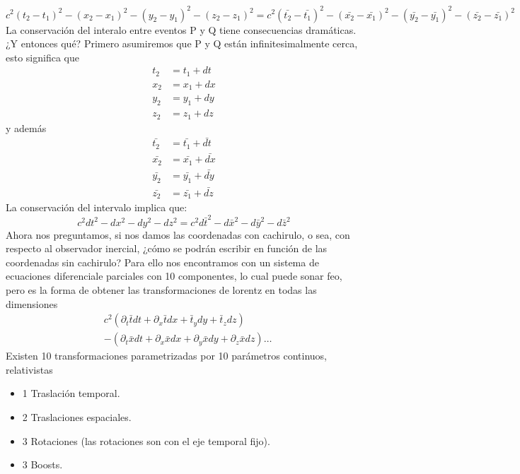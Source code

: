 \documentclass[../main.tex]{subfiles}
\begin{document}
\begin{equation}
    c^2(t_2-t_1)^2-(x_2-x_1)^2-(y_2-y_1)^2-(z_2-z_1)^2=c^2(\bar{t_2}-\bar{t_1})^2-(\bar{x_2}-\bar{x_1})^2-(\bar{y_2}-\bar{y_1})^2-(\bar{z_2}-\bar{z_1})^2
\end{equation}
La conservación del interalo entre eventos P y Q tiene consecuencias dramáticas. ¿Y entonces qué? Primero asumiremos que P y Q están infinitesimalmente cerca, esto significa que
\begin{align*}
    t_2 & =t_1+dt \\
    x_2 & = x_1 + dx \\
    y_2 & = y_1 + dy \\
    z_2 & = z_1 + dz
\end{align*}
y además
\begin{align*}
    \bar{t_2} & = \bar{t_1}+\bar{dt} \\
    \bar{x_2} & = \bar{x_1} + \bar{dx} \\
    \bar{y_2} & = \bar{y_1} + \bar{dy} \\
    \bar{z_2} & = \bar{z_1} + \bar{dz}
\end{align*}
La conservación del intervalo implica que:
\begin{equation}
    c^2dt^2-dx^2-dy^2-dz^2=c^2d\bar{t}^2-d\bar{x}^2-d\bar{y}^2-d\bar{z}^2
\end{equation}
Ahora nos preguntamos, si nos damos las coordenadas con cachirulo, o sea, con respecto al observador inercial, ¿cómo se podrán escribir en función de las coordenadas sin cachirulo?
Para ello nos encontramos con un sistema de ecuaciones diferenciale parciales con 10 componentes, lo cual puede sonar feo, pero es la forma de obtener las transformaciones de lorentz en todas las dimensiones
\begin{align*}
     & c^2\left( \partial_t \bar{t} dt + \partial_x\bar{t}dx + \bar{t}_y dy+ \bar{t}_z dz\right) \\
    & - \left(  \partial_t \bar{x}dt +\partial_x \bar{x}dx+\partial_y \bar{x}dy+\partial_z \bar{x}dz\right) \dots
\end{align*}
Existen 10 transformaciones parametrizadas por 10 parámetros continuos, relativistas
\begin{itemize}
    \item  1 Traslación temporal.
    \item 2 Traslaciones espaciales.
    \item 3 Rotaciones (las rotaciones son con el eje temporal fijo).
    \item 3 Boosts.
\end{itemize}
\end{document}
